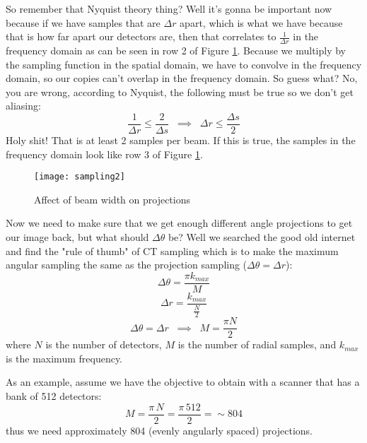 So remember that Nyquist theory thing? Well it's gonna be important now because if we have samples that are $\Delta r$ apart, which is what we have because that is how far apart our detectors are, then that correlates to $\frac{1}{\Delta r}$ in the frequency domain as can be seen in row 2 of Figure \ref{fig:ct:samp2}. Because we multiply by the sampling function in the spatial domain, we have to convolve in the frequency domain, so our copies can't overlap in the frequency domain. So guess what? No, you are wrong, according to Nyquist, the following must be true so we don't get aliasing:
\begin{equation}
\frac{1}{\Delta r} \leq \frac{2}{\Delta s} \; \; \implies \; \; \Delta r \leq \frac{\Delta s}{2}
\end{equation}
Holy shit! That is at least 2 samples per beam. If this is true, the samples in the frequency domain look like row 3 of Figure \ref{fig:ct:samp2}.
\begin{figure}[ht]
	\centering
	\texttt{[image: sampling2]}
	\caption{Affect of beam width on projections}
	\label{fig:ct:samp2}
\end{figure}
Now we need to make sure that we get enough different angle projections to get our image back, but what should $\Delta \theta$ be? Well we searched the good old internet and find the "rule of thumb" of CT sampling which is to make the maximum angular sampling the same as the projection sampling ($\Delta \theta = \Delta r$):
\begin{equation}
\Delta \theta = \frac{\pi k_{max}}{M}
\end{equation}
\begin{equation}
\Delta r = \frac{k_{max}}{\frac{N}{2}} 
\end{equation}
\begin{equation}
\Delta \theta = \Delta r \; \; \implies \; \; M = \frac{\pi N}{2}
\end{equation}
where $N$ is the number of detectors, $M$ is the number of radial samples, and $k_{max}$ is the maximum frequency. 

As an example, assume we have the objective to obtain with a scanner that has a bank of 512 detectors:
\begin{equation}
M = \frac{\pi\, N}{2} = \frac{\pi\, 512}{2} = \sim 804
\end{equation}
thus we need approximately 804 (evenly angularly spaced) projections.